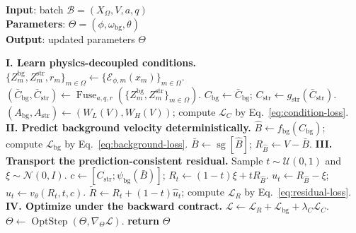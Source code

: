 \documentclass[letterpaper]{article}
\begin{document}
\begin{algorithm}[!b]
	\caption{Training procedure for PD-BG-RFM under the backward contract}
	\label{alg:pdbg-rfm}
	\textbf{Input}: batch $\mathcal B=(X_\Omega,V,a,q)$\\
	\textbf{Parameters}: $\Theta=(\phi,\omega_{\mathrm{bg}},\theta)$\\
	\textbf{Output}: updated parameters $\Theta$
	\begin{algorithmic}[1]
		\STATE \textbf{I. Learn physics-decoupled conditions.}
		\STATE $\{Z_m^{\mathrm{bg}},Z_m^{\mathrm{str}},r_m\}_{m\in\Omega}\gets\{\mathcal E_{\phi,m}(x_m)\}_{m\in\Omega}$.
		\STATE $(\bar C_{\mathrm{bg}},\bar C_{\mathrm{str}})\gets\operatorname{Fuse}_{a,q,r}(\{Z_m^{\mathrm{bg}},Z_m^{\mathrm{str}}\}_{m\in\Omega})$.
		\STATE $C_{\mathrm{bg}}\gets\bar C_{\mathrm{bg}}$; $C_{\mathrm{str}}\gets g_{\mathrm{str}}(\bar C_{\mathrm{str}})$.
		\STATE $(A_{\mathrm{bg}},A_{\mathrm{str}})\gets(W_L(V),W_H(V))$; compute $\mathcal L_C$ by Eq.~\ref{eq:condition-loss}.
		\STATE \textbf{II. Predict background velocity deterministically.}
		\STATE $\hat B\gets f_{\mathrm{bg}}(C_{\mathrm{bg}})$; compute $\mathcal L_{\mathrm{bg}}$ by Eq.~\ref{eq:background-loss}.
		\STATE $\bar B\gets\operatorname{sg}[\hat B]$; $R_{\hat B}\gets V-\bar B$.
		\STATE \textbf{III. Transport the prediction-consistent residual.}
		\STATE Sample $t\sim\mathcal U(0,1)$ and $\xi\sim\mathcal N(0,I)$.
		\STATE $c\gets[C_{\mathrm{str}};\psi_{\mathrm{bg}}(\bar B)]$; $R_t\gets(1-t)\xi+tR_{\hat B}$.
		\STATE $u_t\gets R_{\hat B}-\xi$; $\widehat u_t\gets v_\theta(R_t,t,c)$.
		\STATE $\widetilde R\gets R_t+(1-t)\widehat u_t$; compute $\mathcal L_R$ by Eq.~\ref{eq:residual-loss}.
		\STATE \textbf{IV. Optimize under the backward contract.}
		\STATE $\mathcal L\gets\mathcal L_R+\mathcal L_{\mathrm{bg}}+\lambda_C\mathcal L_C$.
		\STATE $\Theta\gets\operatorname{OptStep}(\Theta,\nabla_\Theta\mathcal L)$.
		\STATE \textbf{return} $\Theta$
	\end{algorithmic}
\end{algorithm}
\end{document}
